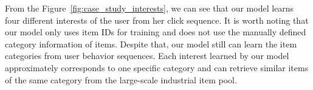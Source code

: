 From the Figure~\ref{fig:case_study_interests}, we can see that our model learns four different interests of the user from her click sequence. It is worth noting that our model only uses item IDs for training and does not use the manually defined category information of items. Despite that, our model still can learn the item categories from user behavior sequences. Each interest learned by our model approximately corresponds to one specific category and can retrieve similar items of the same category from the large-scale industrial item pool. 


